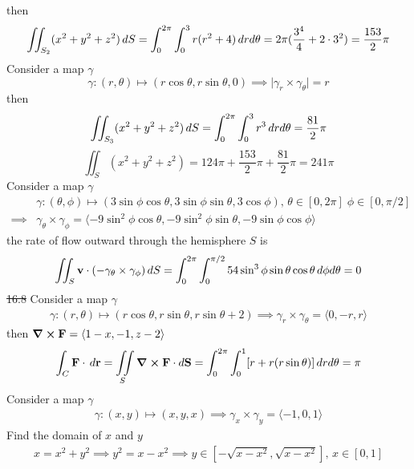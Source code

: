 \documentclass[12pt, a4paper]{article}
\begin{document}
\begin{CJK*}{UTF8}{bsmi}
then 
\begin{align}
    \iint_{S_2}(x^2+y^2+z^2)\,dS = \int_0^{2\pi} \int_0^3 r(r^2+4) \,dr d\theta=2\pi(\dfrac{3^4}{4}+2\cdot 3^2)=\dfrac{153}{2}\pi
\end{align}
Consider a map $\gamma$
\begin{equation}
    \gamma : (r,\theta) \longmapsto (r\cos\theta, r\sin\theta, 0)\implies \mid \gamma_r\times \gamma_\theta\mid = r
\end{equation}
then
\begin{align}
    \iint_{S_3}(x^2+y^2+z^2)\,dS= \int_0^{2\pi}\int_0^3 r^3 \,dr d\theta = \dfrac{81}{2}\pi
\end{align}
\begin{equation}
    \iint_S (x^2+y^2+z^2) = 124 \pi +\dfrac{153}{2}\pi + \dfrac{81}{2}\pi = 241\pi
\end{equation}
Consider a map $\gamma$
\begin{align}
    &\gamma: (\theta,\phi) \longmapsto (3\sin\phi\cos\theta, 3\sin\phi \sin\theta, 3\cos \phi),\, \theta \in [0,2\pi]\; \phi \in [0,\pi/2]\\
    \implies &\gamma_\theta \times \gamma_\phi=  \langle -9\sin^2\phi \cos \theta, -9\sin^2\phi \sin\theta, -9\sin\phi\cos\phi\rangle
\end{align}
the rate of flow outward through the hemisphere $S$ is 
\begin{align}
    \iint_S \textbf{v} \cdot (-\gamma_\theta \times \gamma_\phi)\,dS= \int_0^{2\pi}\int_0^{\pi/2}54\sin^3\phi \sin\theta\cos\theta \,d\phi d\theta=0
\end{align}
\st{16.8}
Consider a map $\gamma$
\begin{align}
    \gamma:(r,\theta) \longmapsto  (r\cos\theta,r\sin\theta,r\sin\theta+2)\implies \gamma_r\times \gamma_\theta = \langle 0,-r,r \rangle
\end{align}
then $\curl{\textbf F}=\langle 1-x,-1,z-2\rangle$
\begin{align}
    \int_C \textbf F \cdot \,d\textbf r = \iint\limits_S \curl{\textbf F}\cdot d\textbf S=\int_0^{2\pi}\int_0^1 [r+r(r\sin\theta)]\,dr d\theta = \pi
\end{align}
Consider a map $\gamma$
\begin{align}
    \gamma: (x,y) \longmapsto (x,y,x) \implies \gamma_x \times \gamma_y = \langle -1,0,1\rangle
\end{align}
Find the domain of $x$ and $y$
\begin{align}
    x=x^2+y^2 \implies y^2 = x-x^2 \implies y \in [-\sqrt{x-x^2},\sqrt{x-x^2}],\,x\in[0,1]

\end{align}
\end{CJK*}
\end{document}
